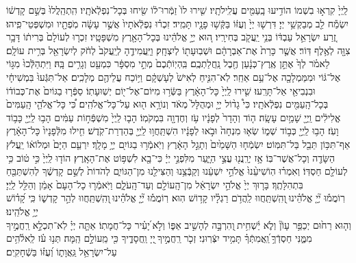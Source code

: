 \documentclass[twoside, openany, parskip=half, 11pt]{book}
\begin{document}
 
 לַֽיְיָ֙ קִרְא֣וּ בִשְׁמוֹ הוֹדִ֥יעוּ בָֽעַמִּ֖ים עֲלִֽילֹתָֽיו׃
שִׁ֤ירוּ לוֹ֙ זַמְּֿרוּ־ל֔וֹ שִׂ֖יחוּ בְּכָל־נִפְלְֿאֹתָֽיו׃
הִֽתְהַֽלֲלוּ֙ בְּשֵׁ֣ם קָדְשׁ֔וֹ יִשְׂמַ֕ח לֵ֖ב מְבַקְשֵׁ֥י יְיָ׃
דִּרְשׁ֤וּ יְיָ֙ וְעֻזּ֔וֹ בַּקְּֿשׁ֥וּ פָנָ֖יו תָּמִֽיד׃
זִכְר֗וּ נִפְלְֿאֹתָיו֙ אֲשֶׁ֣ר עָשָׂ֔ה מֹֽפְתָ֖יו וּמִשְׁפְּטֵי־פִֽיהוּ׃
זֶ֚רַע יִשְׂרָאֵ֣ל עַבְדּ֔וֹ בְּנֵ֥י יַֽעֲקֹ֖ב בְּחִירָֽיו׃
ה֚וּא יְיָ֣ אֱלֹהֵ֔ינוּ 	בְּכָל־הָאָ֖רֶץ מִשְׁפָּטָֽיו׃
זִכְר֤וּ לְעוֹלָם֙ בְּרִית֔וֹ דָּבָ֥ר צִוָּ֖ה לְאֶ֥לֶף דּֽוֹר׃
אֲשֶׁ֤ר כָּרַת֙ אֶת־אַבְרָהָ֔ם וּשְׁבֽוּעָת֖וֹ לְיִצְחָֽק׃
וַיַּֽעֲמִידֶ֤הָ לְיַֽעֲקֹב֙ לְחֹ֔ק לְיִשְׂרָאֵ֖ל בְּרִ֥ית עוֹלָֽם׃
לֵאמֹ֗ר לְךָ֙ אֶתֵּ֣ן אֶֽרֶץ־כְּנָ֔עַן חֶ֖בֶל נַֽחֲלַתְכֶֽם׃
בִּֽהְיֽוֹתְֿכֶם֙ מְתֵ֣י מִסְפָּ֔ר כִּמְעַ֖ט וְגָרִ֥ים בָּֽהּ׃
וַיִּתְהַלְּֿכוּ֙ מִגּ֣וֹי אֶל־גּ֔וֹי וּמִמַּמְלָכָ֖ה אֶל־עַ֥ם אַחֵֽר׃
לֹֽא־הִנִּ֤יחַ לְאִישׁ֙ לְעָשְׁקָ֔ם וַיּ֥וֹכַח עֲלֵיהֶ֖ם מְלָכִֽים׃
אַל־תִּגְּֿעוּ֙ בִּמְשִׁיחָ֔י וּבִנְבִיאַ֖י אַל־תָּרֵֽעוּ׃
שִׁ֤ירוּ לַֽיְיָ֙ כָּל־הָאָ֔רֶץ בַּשְּֿׂר֥וּ מִיּוֹם־אֶל־י֖וֹם יְשֽׁוּעָתֽוֹ׃
סַפְּֿר֤וּ בַגּוֹיִם֙ אֶת־כְּבוֹד֔וֹ בְּכָל־הָֽעַמִּ֖ים נִפְלְֿאֹתָֽיו׃
כִּי֩ גָד֨וֹל יְיָ֤ וּמְהֻלָּל֙ מְאֹ֔ד וְנוֹרָ֥א ה֖וּא עַל־כָּל־אֱלֹהִֽים׃
כִּ֠י כָּל־אֱלֹהֵ֤י הָֽעַמִּים֙ אֱלִילִ֔ים וַֽיְיָ֖ שָׁמַ֥יִם עָשָֽׂה׃
ה֤וֹד וְהָדָר֙ לְפָנָ֔יו עֹ֥ז וְחֶדְוָ֖ה בִּמְקֹמֽוֹ׃
הָב֤וּ לַֽיְיָ֙ מִשְׁפְּֿח֣וֹת עַמִּ֔ים הָב֥וּ לַֽיְיָ֖ כָּב֥וֹד וָעֹֽז׃
הָב֥וּ לַֽיְיָ֖ כְּב֣וֹד שְׁמ֑וֹ שְׂא֤וּ מִנְחָה֙ וּבֹ֣אוּ לְפָנָ֔יו
הִשְׁתַּֽחֲו֥וּ לַֽיְיָ֖ בְּהַדְרַת־קֹֽדֶשׁ׃
חִ֤ילוּ מִלְּֿפָנָיו֙ כָּל־הָאָ֔רֶץ אַף־תִּכּ֥וֹן תֵּבֵ֖ל בַּל־תִּמּֽוֹט׃
 יִשְׂמְֿח֤וּ הַשָּׁמַ֙יִם֙ וְתָגֵ֣ל הָאָ֔רֶץ וְיֹֽאמְֿר֥וּ בַגּוֹיִ֖ם יְיָ֥ מָלָֽךְ׃
יִרְעַ֤ם הַיָּם֙ וּמְלוֹא֔וֹ יַֽעֲלֹץ הַשָּׂדֶ֖ה וְכָל־אֲשֶׁר־בּֽוֹ׃
אָ֥ז יְרַֽנֲנ֖וּ עֲצֵ֣י הַיָּ֑עַר מִלִּפְנֵ֣י יְיָ֔ כִּי־בָ֖א לִשְׁפּ֥וֹט אֶת־הָאָֽרֶץ׃
הוֹד֤וּ לַֽיְיָ֙ כִּ֣י ט֔וֹב כִּ֥י לְעוֹלָ֖ם חַסְדּֽוֹ׃
וְאִמְר֗וּ הֽוֹשִׁיעֵ֨נוּ֙ אֱלֹהֵ֣י יִשְׁעֵ֔נוּ וְקַבְּֿצֵ֥נוּ וְהַצִּילֵ֖נוּ מִן־הַגּוֹיִ֑ם לְהֹדוֹת֙ לְשֵׁ֣ם קָדְשֶׁ֔ךָ לְהִשְׁתַּבֵּ֖חַ בִּתְהִלָּתֶֽךָ׃
בָּר֤וּךְ יְיָ֙ אֱלֹהֵ֣י יִשְׂרָאֵ֔ל מִן־הָֽעוֹלָ֖ם וְעַד־הָֽעֹלָ֑ם וַיֹּֽאמְֿר֤וּ כָל־הָעָם֙ אָמֵ֔ן וְהַלֵּ֖ל לַֽיְיָ׃\\
רֽוֹמֲמ֡וּ
 יְ֘יָ֤ אֱלֹהֵ֗ינוּ ֖וְהִֽשְׁתַּֽחֲווּ לַֽהֲדֹ֥ם רַגְלָ֗יו קָד֥וֹשׁ הֽוּא׃
 רֽוֹמֲמ֡וּ יְ֘יָ֤ אֱלֹהֵ֗ינוּ ֖וְהִֽשְׁתַּֽחֲווּ לְהַ֣ר קָדְשׁ֑וֹ כִּֽי קָ֝ד֗וֹשׁ יְיָ֥ אֱלֹהֵֽינוּ׃\\
 וְה֤וּא
  רַח֙וּם יְכַפֵּ֥ר עָוֹן֘ וְלֹ֢א יַ֫שְׁחִ֥ית ֖וְהִרְבָּ֣ה לְהָשִׁ֣יב אַפּ֑וֹ וְלֹ֣א ֝יָעִ֗יר כָּל־חֲמָתֽוֹ׃
אַתָּ֤ה
יְיָ֗ לֹֽא־תִכְלָ֣א רַֽחֲמֶ֣יךָ מִמֶּ֑נִּי חַסְדְֿךָ֥ ֝וַֽאֲמִתְּֿךָ֗ תָּמִ֥יד יִצְּֿרֽוּנִי׃
זְכֹ֤ר
 רַֽחֲמֶ֣יךָ ֖יְיָ וַֽחֲסָדֶ֑יךָ כִּ֖י מֵֽעוֹלָ֣ם הֵֽמָּה׃
תְּנ֥וּ
עֹ֗ז לֵֽאלֹ֫הִ֥ים עַל־יִשְׂרָאֵ֥ל גַּֽאֲוָת֑וֹ וְ֝עֻזּ֗וֹ בַּשְֿׁחָקִֽים׃
\end{document}
